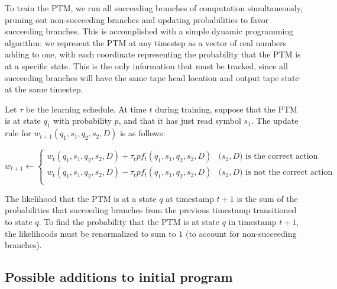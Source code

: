 \documentclass{article}
\begin{document}

To train the PTM, we run all succeeding branches of computation simultaneously, pruning out non-succeeding branches and updating probabilities to favor succeeding branches. This is accomplished with a simple dynamic programming algorithm: we represent the PTM at any timestep as a vector of real numbers adding to one, with each coordinate representing the probability that the PTM is at a specific state. This is the only information that must be tracked, since all succeeding branches will have the same tape head location and output tape state at the same timestep.

Let $\tau$ be the learning schedule. At time $t$ during training, suppose that the PTM is at state $q_1$ with probability $p$, and that it has just read symbol $s_1$. The update rule for $w_{t+1}(q_1, s_1, q_2, s_2, D)$ is as follows:

\[ w_{t+1}\leftarrow 
\begin{cases}
    w_t(q_1, s_1, q_2, s_2, D) + \tau_tpf_t(q_1, s_1, q_2, s_2, D) & \text{($s_2, D$) is the correct action}\\
    w_t(q_1, s_1, q_2, s_2, D) - \tau_tpf_t(q_1, s_1, q_2, s_2, D) & \text{($s_2, D$) is not the correct action}\\
\end{cases}
\]

The likelihood that the PTM is at a state $q$ at timestamp $t+1$ is the sum of the probabilities that succeeding branches from the previous timestamp transitioned to state $q$. To find the probability that the PTM is at state $q$ in timestamp $t+1$, the likelihoods must be renormalized to sum to $1$ (to account for non-succeeding branches).

\subsection{Possible additions to initial program}
\end{document}
